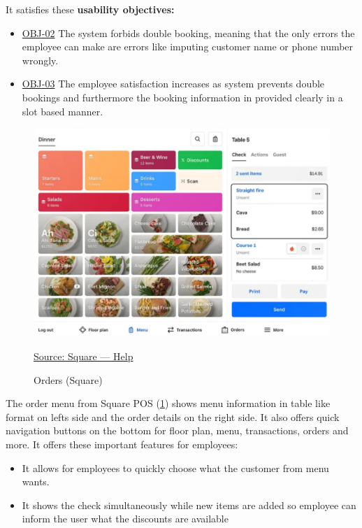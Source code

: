 \documentclass[]{VUMIFTemplateClass}
\begin{document}
It satisfies these \textbf{usability objectives:}

\begin{itemize}
    \item \hyperref[OBJ-02]{OBJ-02} The system forbids double booking, meaning that the only errors the employee can make are errors like imputing customer name or phone number wrongly.
    \item \hyperref[OBJ-03]{OBJ-03} The employee satisfaction increases as system prevents double bookings and furthermore the booking information in provided clearly in a slot based manner.
\end{itemize}


\begin{figure}[H]
    \centering
    \includegraphics[width=\textwidth]{images/examples/square_orders.png}
    \caption{Orders (Square)}
    \href{https://squareup.com/help/us/en}{Source: Square — Help}
    \label{fig:square-orders}
\end{figure}

The order menu from Square POS (\ref{fig:square-orders}) shows menu information
in table like format on lefts side and the order details on the right side. It
also offers quick navigation buttons on the bottom for floor plan, menu,
transactions, orders and more. It offers these important features for employees:

\begin{itemize}
    \item It allows for employees to quickly choose what the customer from menu wants.
    \item It shows the check simultaneously while new items are added so employee can inform the user what the discounts are available
\end{itemize}
\end{document}
